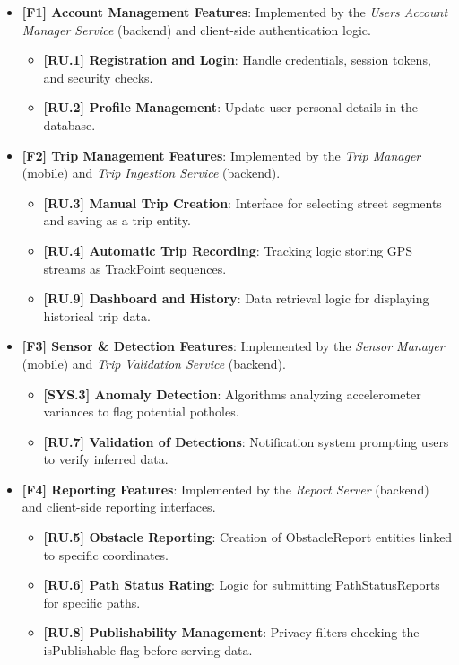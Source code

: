 \begin{itemize}
    \item \textbf{[F1] Account Management Features}: Implemented by the \textit{Users Account Manager Service} (backend) and client-side authentication logic.
    \begin{itemize}
        \item \textbf{[RU.1] Registration and Login}: Handle credentials, session tokens, and security checks.
        \item \textbf{[RU.2] Profile Management}: Update user personal details in the database.
    \end{itemize}
    
    \item \textbf{[F2] Trip Management Features}: Implemented by the \textit{Trip Manager} (mobile) and \textit{Trip Ingestion Service} (backend).
    \begin{itemize}
        \item \textbf{[RU.3] Manual Trip Creation}: Interface for selecting street segments and saving as a trip entity.
        \item \textbf{[RU.4] Automatic Trip Recording}: Tracking logic storing GPS streams as TrackPoint sequences.
        \item \textbf{[RU.9] Dashboard and History}: Data retrieval logic for displaying historical trip data.
    \end{itemize}
    
    \item \textbf{[F3] Sensor \& Detection Features}: Implemented by the \textit{Sensor Manager} (mobile) and \textit{Trip Validation Service} (backend).
    \begin{itemize}
        \item \textbf{[SYS.3] Anomaly Detection}: Algorithms analyzing accelerometer variances to flag potential potholes.
        \item \textbf{[RU.7] Validation of Detections}: Notification system prompting users to verify inferred data.
    \end{itemize}
    
    \item \textbf{[F4] Reporting Features}: Implemented by the \textit{Report Server} (backend) and client-side reporting interfaces.
    \begin{itemize}
        \item \textbf{[RU.5] Obstacle Reporting}: Creation of ObstacleReport entities linked to specific coordinates.
        \item \textbf{[RU.6] Path Status Rating}: Logic for submitting PathStatusReports for specific paths.
        \item \textbf{[RU.8] Publishability Management}: Privacy filters checking the isPublishable flag before serving data.
    \end{itemize}
    

\end{itemize}
